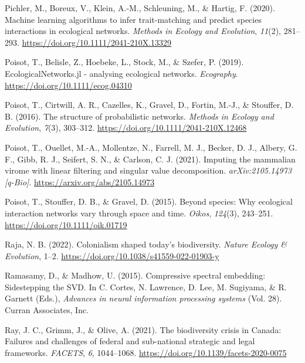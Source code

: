 \documentclass[10pt,oneside]{article}
\newlength{\cslhangindent}
\newenvironment{CSLReferences}[2] %
 {%
  \setlength{\parindent}{0pt}
  \ifodd #1 \everypar{\setlength{\hangindent}{\cslhangindent}}\ignorespaces\fi
  \ifnum #2 > 0
  \setlength{\parskip}{#2\baselineskip}
  \fi
 }%
 {}
\begin{document}
\begin{CSLReferences}{1}{0}
\leavevmode{}%
Pichler, M., Boreux, V., Klein, A.-M., Schleuning, M., \& Hartig, F.
(2020). Machine learning algorithms to infer trait-matching and predict
species interactions in ecological networks. \emph{Methods in Ecology
and Evolution}, \emph{11}(2), 281--293.
\url{https://doi.org/10.1111/2041-210X.13329}

\leavevmode{}%
Poisot, T., Belisle, Z., Hoebeke, L., Stock, M., \& Szefer, P. (2019).
EcologicalNetworks.jl - analysing ecological networks. \emph{Ecography}.
\url{https://doi.org/10.1111/ecog.04310}

\leavevmode{}%
Poisot, T., Cirtwill, A. R., Cazelles, K., Gravel, D., Fortin, M.-J., \&
Stouffer, D. B. (2016). The structure of probabilistic networks.
\emph{Methods in Ecology and Evolution}, \emph{7}(3), 303--312.
\url{https://doi.org/10.1111/2041-210X.12468}

\leavevmode{}%
Poisot, T., Ouellet, M.-A., Mollentze, N., Farrell, M. J., Becker, D.
J., Albery, G. F., Gibb, R. J., Seifert, S. N., \& Carlson, C. J.
(2021). Imputing the mammalian virome with linear filtering and singular
value decomposition. \emph{arXiv:2105.14973 {[}q-Bio{]}}.
\url{https://arxiv.org/abs/2105.14973}

\leavevmode{}%
Poisot, T., Stouffer, D. B., \& Gravel, D. (2015). Beyond species: Why
ecological interaction networks vary through space and time.
\emph{Oikos}, \emph{124}(3), 243--251.
\url{https://doi.org/10.1111/oik.01719}

\leavevmode{}%
Raja, N. B. (2022). Colonialism shaped today's biodiversity.
\emph{Nature Ecology \& Evolution}, 1--2.
\url{https://doi.org/10.1038/s41559-022-01903-y}

\leavevmode{}%
Ramasamy, D., \& Madhow, U. (2015). Compressive spectral embedding:
Sidestepping the SVD. In C. Cortes, N. Lawrence, D. Lee, M. Sugiyama, \&
R. Garnett (Eds.), \emph{Advances in neural information processing
systems} (Vol. 28). Curran Associates, Inc.

\leavevmode{}%
Ray, J. C., Grimm, J., \& Olive, A. (2021). The biodiversity crisis in
Canada: Failures and challenges of federal and sub-national strategic
and legal frameworks. \emph{FACETS}, \emph{6}, 1044--1068.
\url{https://doi.org/10.1139/facets-2020-0075}


\end{CSLReferences}
\end{document}
